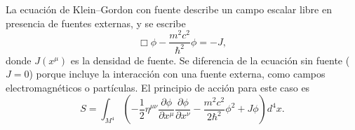 La ecuación de Klein--Gordon con fuente describe un campo escalar libre
en presencia de fuentes externas, y se escribe
\[
\Box\phi-\frac{m^2c^2}{\hbar^2}\phi=-J, \tag{158}
\]
donde $J(x^\mu)$ es la densidad de fuente. Se diferencia de la ecuación
sin fuente ($J=0$) porque incluye la interacción con una fuente externa,
como campos electromagnéticos o partículas. El principio de acción para
este caso es
\[
S=\int_{M^4}\left(-\frac12\eta^{\mu\nu}\frac{\partial\phi}{\partial x^\mu}
\frac{\partial\phi}{\partial x^\nu}-\frac{m^2c^2}{2\hbar^2}\phi^2+J\phi
\right)d^4x. \tag{159}
\]
